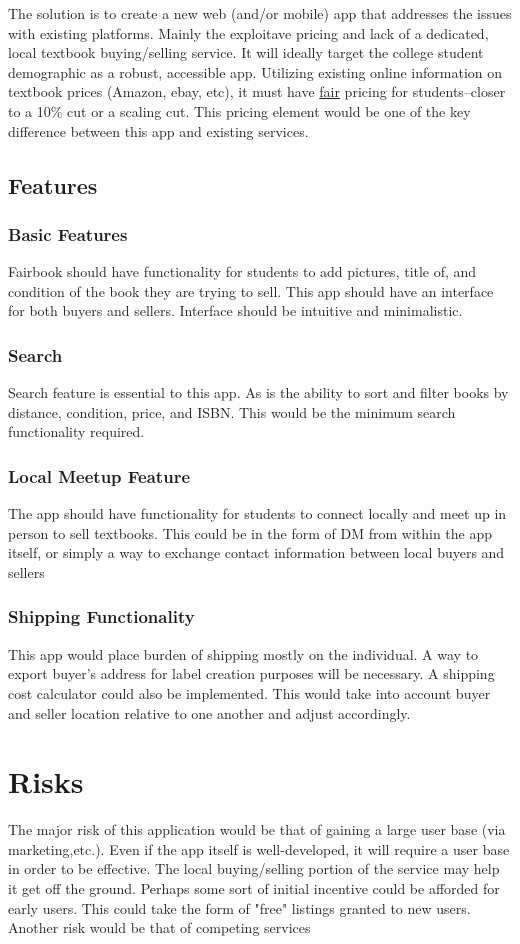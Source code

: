 \documentclass[12pt]{article}
\begin{document}
	The solution is to create a new web (and/or mobile) app that addresses the issues with existing platforms. Mainly the
	exploitave pricing and lack of a dedicated, local textbook buying/selling service.
	It will ideally target the college student demographic as a robust, accessible app. Utilizing existing online
        information on textbook prices (Amazon, ebay, etc), it must have \underline{fair} pricing for students--closer to a 10\% cut or a scaling cut. 
	This pricing element would be one of the key difference between this app and existing services.
	\subsection{Features}
		\subsubsection{Basic Features}
		Fairbook should have functionality for students to add pictures, title of, and condition of the book they are trying to sell.
		This app should have an interface for both buyers and sellers. Interface should be intuitive and minimalistic.
		\subsubsection{Search}
        	Search feature is essential to this app. As is the ability to sort and filter books by distance, condition, price, and ISBN. This would be the minimum
		search functionality required.
		\subsubsection{Local Meetup Feature}
		The app should have functionality for students to connect locally and meet up in person to sell textbooks.
		This could be in the form of DM from within the app itself, or simply a way to exchange contact information between local buyers and sellers	
		\subsubsection{Shipping Functionality}
		This app would place burden of shipping mostly on the individual. A way to export buyer's address for label creation
		purposes will be necessary. A shipping cost calculator could also be implemented. This would take into account buyer and seller location
		relative to one another and adjust accordingly. 

	\section{Risks}
	The major risk of this application would be that of gaining a large user base (via marketing,etc.).
        Even if the app itself is well-developed, it will require a user base in order to be effective. The local
	buying/selling portion of the service may help it get off the ground.	
	Perhaps some sort of initial incentive could be afforded for early users. This could take the form of "free"
	listings granted to new users. Another risk would be that of competing services	




\end{document}

